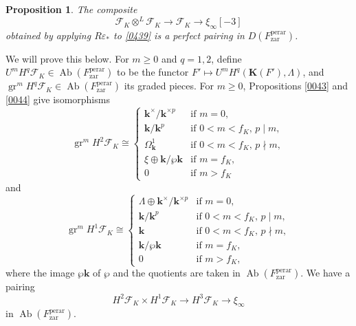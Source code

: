\documentclass{amsart}
\newtheorem{Prop}[Thm]{Proposition}
\theoremstyle{remark}
\numberwithin{equation}{subsection}
\newcommand{\tensor}{\mathbin{\otimes}}
\newcommand{\zar}{\mathrm{zar}}
\newcommand{\perar}{\mathrm{perar}}
\newcommand{\alg}[1]{\mathbf{#1}}
\DeclareMathOperator{\Ab}{Ab}
\DeclareMathOperator{\gr}{gr}
\begin{document}
\begin{Prop} \label{0050}
	The composite
		\[
				\mathcal{F}_{K} \tensor^{L} \mathcal{F}_{K}
			\to
				\mathcal{F}_{K}
			\to
				\xi_{\infty}[-3]
		\]
	obtained by applying $R \varepsilon_{\ast}$ to \eqref{0439}
	is a perfect pairing in $D(F^{\perar}_{\zar})$.
\end{Prop}

We will prove this below.
For $m \ge 0$ and $q = 1, 2$, define
$U^{m} H^{q} \mathcal{F}_{K} \in \Ab(F^{\perar}_{\zar})$
to be the functor
$F' \mapsto U^{m} H^{q}(\alg{K}(F'), \Lambda)$,
and $\gr^{m} H^{q} \mathcal{F}_{K} \in \Ab(F^{\perar}_{\zar})$ its graded pieces.
For $m \ge 0$, Propositions \ref{0043} and \ref{0044} give isomorphisms
	\begin{equation} \label{0440}
			\gr^{m} H^{2} \mathcal{F}_{K}
		\cong
			\begin{cases}
						\alg{k}^{\times} / \alg{k}^{\times p}
				&	\text{if }
						m = 0,
				\\
						\alg{k} / \alg{k}^{p}
				&	\text{if }
						0 < m < f_{K},\, p \mid m,
				\\
						\Omega_{\alg{k}}^{1}
				&	\text{if }
						0 < m < f_{K},\, p \nmid m,
				\\
						\xi \oplus \alg{k} / \wp \alg{k}
				&	\text{if }
						m = f_{K},
				\\
						0
				&	\text{if }
						m > f_{K}
			\end{cases}
	\end{equation}
and
	\begin{equation} \label{0441}
			\gr^{m} H^{1} \mathcal{F}_{K}
		\cong
			\begin{cases}
						\Lambda \oplus \alg{k}^{\times} / \alg{k}^{\times p}
				&	\text{if }
						m = 0,
				\\
						\alg{k} / \alg{k}^{p}
				&	\text{if }
						0 < m < f_{K},\, p \mid m,
				\\
						\alg{k}
				&	\text{if }
						0 < m < f_{K},\, p \nmid m,
				\\
						\alg{k} / \wp \alg{k}
				&	\text{if }
						m = f_{K},
				\\
						0
				&	\text{if }
						m > f_{K},
			\end{cases}
	\end{equation}
where the image $\wp \alg{k}$ of $\wp$ and the quotients are taken in $\Ab(F^{\perar}_{\zar})$.
We have a pairing
	\[
				H^{2} \mathcal{F}_{K}
			\times
				H^{1} \mathcal{F}_{K}
		\to
			H^{3} \mathcal{F}_{K}
		\to
			\xi_{\infty}
	\]
in $\Ab(F^{\perar}_{\zar})$.
\end{document}

